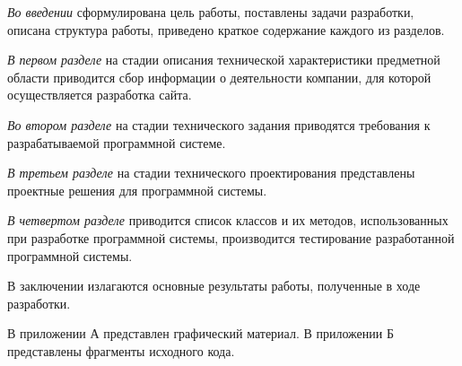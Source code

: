 \emph{Во введении} сформулирована цель работы, поставлены задачи разработки, описана структура работы, приведено краткое содержание каждого из разделов.

\emph{В первом разделе} на стадии описания технической характеристики предметной области приводится сбор информации о деятельности компании, для которой осуществляется разработка сайта.

\emph{Во втором разделе} на стадии технического задания приводятся требования к разрабатываемой программной системе.

\emph{В третьем разделе} на стадии технического проектирования представлены проектные решения для программной системы.

\emph{В четвертом разделе} приводится список классов и их методов, использованных при разработке программной системы, производится тестирование разработанной программной системы.

В заключении излагаются основные результаты работы, полученные в ходе разработки.

В приложении А представлен графический материал.
В приложении Б представлены фрагменты исходного кода. 
